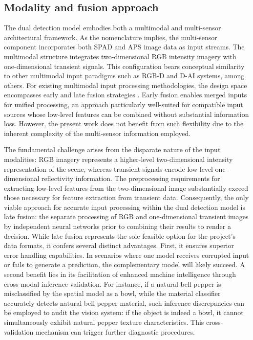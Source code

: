 \documentclass[12pt,a4paper,oneside]{report}
\begin{document}
\subsection{Modality and fusion approach}
\label{subsec:modality_fusion_approach}

The dual detection model embodies both a multimodal and multi-sensor architectural framework. As the nomenclature implies, the multi-sensor component incorporates both SPAD and APS image data as input streams. The multimodal structure integrates two-dimensional RGB intensity imagery with one-dimensional transient signals. This configuration bears conceptual similarity to other multimodal input paradigms such as RGB-D and D-AI systems, among others. For existing multimodal input processing methodologies, the design space encompasses early and late fusion strategies \cite{gadzicki2020}. Early fusion enables merged inputs for unified processing, an approach particularly well-suited for compatible input sources whose low-level features can be combined without substantial information loss. However, the present work does not benefit from such flexibility due to the inherent complexity of the multi-sensor information employed.

The fundamental challenge arises from the disparate nature of the input modalities: RGB imagery represents a higher-level two-dimensional intensity representation of the scene, whereas transient signals encode low-level one-dimensional reflectivity information. The preprocessing requirements for extracting low-level features from the two-dimensional image substantially exceed those necessary for feature extraction from transient data. Consequently, the only viable approach for accurate input processing within the dual detection model is late fusion: the separate processing of RGB and one-dimensional transient images by independent neural networks prior to combining their results to render a decision. While late fusion represents the sole feasible option for the project's data formats, it confers several distinct advantages. First, it ensures superior error handling capabilities. In scenarios where one model receives corrupted input or fails to generate a prediction, the complementary model will likely succeed. A second benefit lies in its facilitation of enhanced machine intelligence through cross-modal inference validation. For instance, if a natural bell pepper is misclassified by the spatial model as a bowl, while the material classifier accurately detects natural bell pepper material, such inference discrepancies can be employed to audit the vision system: if the object is indeed a bowl, it cannot simultaneously exhibit natural pepper texture characteristics. This cross-validation mechanism can trigger further diagnostic procedures.
\end{document}
